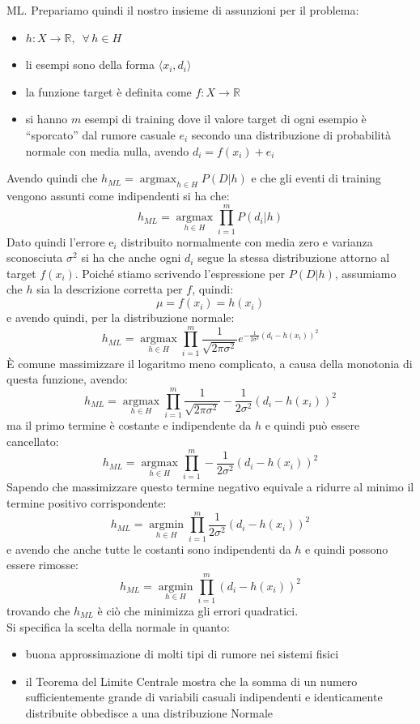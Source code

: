 \documentclass[a4paper,12pt, oneside]{book}
\begin{document}
ML. Prepariamo quindi il nostro insieme di assunzioni per il problema:
\begin{itemize}
  \item $h:X\to\mathbb{R},\,\,\,\forall\,h\in H$
  \item li esempi sono della forma $\langle x_i, d_i\rangle$
  \item la funzione target è definita come $f:X\to\mathbb{R}$
  \item si hanno $m$ esempi di training dove il valore target di ogni esempio è
  ``sporcato'' dal rumore casuale $e_i$ secondo una distribuzione di probabilità
  normale con media nulla, avendo $d_i=f(x_i)+e_i$
\end{itemize}
Avendo quindi che $h_{ML}=\operatorname*{argmax}_{h\in H}P(D|h)$ e che gli
eventi di training vengono assunti come indipendenti si ha che:
\[h_{ML}=\operatorname*{argmax}_{h\in H}\prod_{i=1}^mP(d_i|h)\]
Dato quindi l'errore e$_i$ distribuito normalmente con media zero e varianza
sconosciuta $\sigma^2$ si ha che anche ogni $d_i$ segue la stessa
distribuzione attorno al target $f(x_i)$. Poiché stiamo scrivendo l'espressione
per $P(D|h)$, assumiamo che $h$ sia la descrizione corretta per $f$, quindi:
\[\mu=f(x_i)=h(x_i)\]
e avendo quindi, per la distribuzione normale:
\[h_{ML}=\operatorname*{argmax}_{h\in H}
  \prod_{i=1}^m\frac{1}{\sqrt{2\pi\sigma^2}}
  e^{-\frac{1}{2\sigma^2}(d_i-h(x_i))^2}\]
È comune massimizzare il logaritmo meno complicato, a causa della monotonia di
questa funzione, avendo:
\[h_{ML}=\operatorname*{argmax}_{h\in
    H}\prod_{i=1}^m\frac{1}{\sqrt{2\pi\sigma^2}}
  -\frac{1}{2\sigma^2}(d_i-h(x_i))^2\]
ma il primo termine è costante e indipendente da $h$ e quindi può essere
cancellato:
\[h_{ML}=\operatorname*{argmax}_{h\in
    H}\prod_{i=1}^m -\frac{1}{2\sigma^2}(d_i-h(x_i))^2\]
Sapendo che massimizzare questo termine negativo equivale a ridurre al minimo il
termine positivo corrispondente:
\[h_{ML}=\operatorname*{argmin}_{h\in
    H}\prod_{i=1}^m \frac{1}{2\sigma^2}(d_i-h(x_i))^2\]
e avendo che anche tutte le costanti sono indipendenti da $h$ e quindi possono
essere rimosse:
\[h_{ML}=\operatorname*{argmin}_{h\in H}\prod_{i=1}^m (d_i-h(x_i))^2\]
trovando che $h_{ML}$ è ciò che minimizza gli errori quadratici. \\
Si specifica la scelta della normale in quanto:
\begin{itemize}
  \item buona approssimazione di molti tipi di rumore nei sistemi fisici 
  \item il Teorema del Limite Centrale mostra che la somma di un numero
  sufficientemente grande di variabili casuali indipendenti e identicamente
  distribuite obbedisce a una distribuzione Normale 
\end{itemize}
\end{document}

